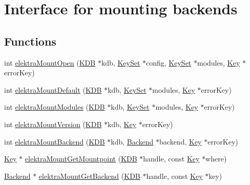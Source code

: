 \hypertarget{group__mount}{
\section{Interface for mounting backends}
\label{group__mount}
}
\subsection*{Functions}
\begin{DoxyCompactItemize}
\item 
int \hyperlink{group__mount_gad3c84032644ff56feb44106a7924d3fe}{elektraMountOpen} (\hyperlink{struct__KDB}{KDB} $\ast$kdb, \hyperlink{struct__KeySet}{KeySet} $\ast$config, \hyperlink{struct__KeySet}{KeySet} $\ast$modules, \hyperlink{struct__Key}{Key} $\ast$errorKey)
\item 
int \hyperlink{group__mount_ga97152dfe71e1c834476d5dd12c71c54f}{elektraMountDefault} (\hyperlink{struct__KDB}{KDB} $\ast$kdb, \hyperlink{struct__KeySet}{KeySet} $\ast$modules, \hyperlink{struct__Key}{Key} $\ast$errorKey)
\item 
int \hyperlink{group__mount_ga54e32ffc628b2ca1e1876efb6d28cfc7}{elektraMountModules} (\hyperlink{struct__KDB}{KDB} $\ast$kdb, \hyperlink{struct__KeySet}{KeySet} $\ast$modules, \hyperlink{struct__Key}{Key} $\ast$errorKey)
\item 
int \hyperlink{group__mount_ga6362fc7585d7a308c08005cb3cb1a4cd}{elektraMountVersion} (\hyperlink{struct__KDB}{KDB} $\ast$kdb, \hyperlink{struct__Key}{Key} $\ast$errorKey)
\item 
int \hyperlink{group__mount_ga746a6f6758e8cdfb985b4c46a0e246ff}{elektraMountBackend} (\hyperlink{struct__KDB}{KDB} $\ast$kdb, \hyperlink{struct__Backend}{Backend} $\ast$backend, \hyperlink{struct__Key}{Key} $\ast$errorKey)
\item 
\hyperlink{struct__Key}{Key} $\ast$ \hyperlink{group__mount_ga0cdbb658c5ac280672e4ac22419075f1}{elektraMountGetMountpoint} (\hyperlink{struct__KDB}{KDB} $\ast$handle, const \hyperlink{struct__Key}{Key} $\ast$where)
\item 
\hyperlink{struct__Backend}{Backend} $\ast$ \hyperlink{group__mount_gaa66ed093e4c71d97018ffc66d46d0e1f}{elektraMountGetBackend} (\hyperlink{struct__KDB}{KDB} $\ast$handle, const \hyperlink{struct__Key}{Key} $\ast$key)
\end{DoxyCompactItemize}


